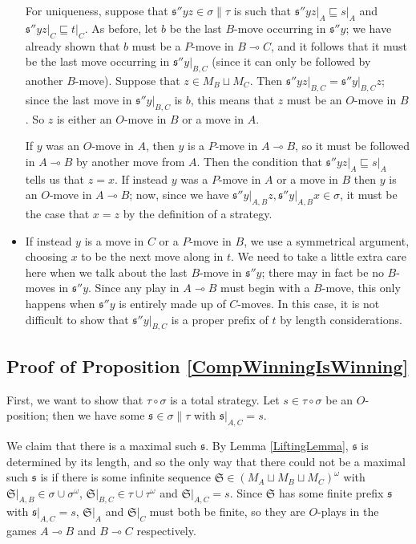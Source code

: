\documentclass[11pt]{article} %
\theoremstyle{plain} %
\theoremstyle{definition} %
\theoremstyle{note}
\theoremstyle{exercisestyle}
\renewcommand{\implies}{\multimap}
\newcommand{\comp}[2]{#1 \circ #2}
\newcommand{\cprd}{\sqcup}
\newcommand{\s}{\mathfrak s}
\newcommand{\prefix}{\sqsubseteq}
\renewcommand{\S}{{\mathfrak{S}}}
\begin{document}
\begin{itemize}
    For uniqueness, suppose that $\s''yz\in\sigma\|\tau$ is such that $\s''yz\vert_A\prefix s\vert_A$ and $\s''yz\vert_C\prefix t\vert_C$.  As before, let $b$ be the last $B$-move occurring in $\s''y$; we have already shown that $b$ must be a $P$-move in $B\implies C$, and it follows that it must be the last move occurring in $\s''y\vert_{B,C}$ (since it can only be followed by another $B$-move).  Suppose that $z\in M_B\cprd M_C$.  Then $\s''yz\vert_{B,C}=\s''y\vert_{B,C}z$; since the last move in $\s''y\vert_{B,C}$ is $b$, this means that $z$ must be an $O$-move in $B$.  So $z$ is either an $O$-move in $B$ or a move in $A$.

    If $y$ was an $O$-move in $A$, then $y$ is a $P$-move in $A\implies B$, so it must be followed in $A\implies B$ by another move from $A$.  Then the condition that $\s''yz\vert_A\prefix s\vert_A$ tells us that $z=x$.  If instead $y$ was a $P$-move in $A$ or a move in $B$ then $y$ is an $O$-move in $A\implies B$; now, since we have $\s''y\vert_{A,B}z,\s''y\vert_{A,B}x\in\sigma$, it must be the case that $x=z$ by the definition of a strategy.

  \item If instead $y$ is a move in $C$ or a $P$-move in $B$, we use a symmetrical argument, choosing $x$ to be the next move along in $t$.  We need to take a little extra care here when we talk about the last $B$-move in $\s''y$; there may in fact be no $B$-moves in $\s''y$.  Since any play in $A\implies B$ must begin with a $B$-move, this only happens when $\s''y$ is entirely made up of $C$-moves.  In this case, it is not difficult to show that $\s''y\vert_{B,C}$ is a proper prefix of $t$ by length considerations.  \qedhere
\end{itemize}

\subsection{Proof of Proposition \ref{CompWinningIsWinning}}
\label{CompWinningIsWinningProof}

First, we want to show that $\comp\tau\sigma$ is a total strategy.  Let $s\in\comp\tau\sigma$ be an $O$-position; then we have some $\s\in\sigma\|\tau$ with $\s\vert_{A,C}=s$.  

We claim that there is a maximal such $\s$.  By Lemma \ref{LiftingLemma}, $\s$ is determined by its length, and so the only way that there could not be a maximal such $\s$ is if there is some infinite sequence $\S\in(M_A\cprd M_B\cprd M_C)^\omega$ with $\S\vert_{A,B}\in\sigma\cup\sigma^\omega$, $\S\vert_{B,C}\in\tau\cup\tau^\omega$ and $\S\vert_{A,C}=s$.  Since $\S$ has some finite prefix $\s$ with $\s\vert_{A,C}=s$, $\S\vert_A$ and $\S\vert_C$ must both be finite, so they are $O$-plays in the games $A\implies B$ and $B\implies C$ respectively.  
\end{document}
